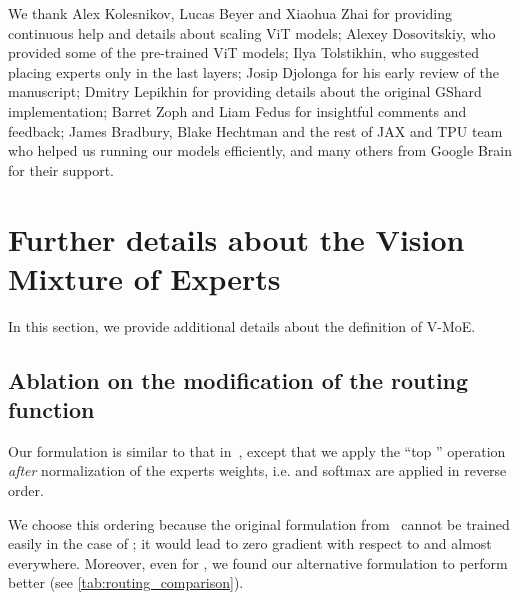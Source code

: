 \documentclass{article}
\newcommand{\abbv}{{V-MoE}}
\begin{document}
 
\clearpage

\begin{ack}
We thank Alex Kolesnikov, Lucas Beyer and Xiaohua Zhai for providing continuous help and details about scaling ViT models;
Alexey Dosovitskiy, who provided some of the pre-trained ViT models;
Ilya Tolstikhin, who suggested placing experts only in the last layers;
Josip Djolonga for his early review of the manuscript;
Dmitry Lepikhin for providing details about the original GShard implementation;
Barret Zoph and Liam Fedus for insightful comments and feedback;
James Bradbury, Blake Hechtman and the rest of JAX and TPU team who helped us running our models efficiently,
and many others from Google Brain for their support.
\end{ack}







\clearpage
\appendix
\clearpage
\section{Further details about the Vision Mixture of Experts}
\label{sec:app_moe_model}

In this section, we provide additional details about the definition of \abbv{}.

\subsection{Ablation on the modification of the routing function}

Our formulation is similar to that in~\cite{shazeer2017outrageously}, except that we apply the ``top '' operation \textit{after} normalization of the experts weights, i.e.  and softmax are applied in reverse order.

We choose this ordering because the original formulation from~\cite{shazeer2017outrageously} cannot be trained easily in the case of ; it would lead to zero gradient with respect to  and  almost everywhere.
Moreover, even for , we found our alternative formulation to perform better (see \cref{tab:routing_comparison}). 

\begin{table}
\begin{center}
\vspace*{3mm}
\caption{\label{tab:routing_comparison} Comparison of routing functions.}
\end{center}
\end{table}
\end{document}
